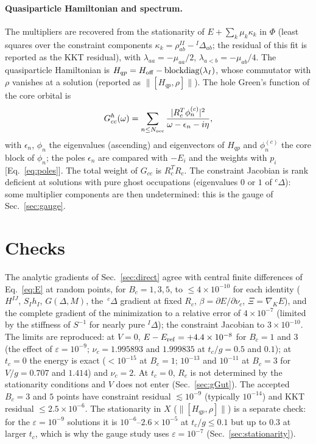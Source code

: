 \documentclass[11pt]{article}
\begin{document}
\paragraph{Quasiparticle Hamiltonian and spectrum.}\label{sec:spectrum}
The multipliers are recovered from the stationarity of $E+\sum_k\mu_k\kappa_k$ in $\Phi$ (least squares over the constraint
components $\kappa_k=\rho^{II}_{ab}-{}^I\Delta_{ab}$; the residual of this fit is reported as the KKT residual), with
$\lambda_{aa}=-\mu_{aa}/2$, $\lambda_{a<b}=-\mu_{ab}/4$. The quasiparticle Hamiltonian is
$H_{qp}=H_{\rm off}-\mathrm{blockdiag}(\lambda_I)$, whose commutator with $\rho$ vanishes at a solution (reported as
$\|[H_{qp},\rho]\|$). The hole Green's function of the core orbital is
\begin{equation}
G^h_{cc}(\omega)=\sum_{n\le N_{\rm occ}}\frac{|R_c^T\phi^{(c)}_n|^2}{\omega-\epsilon_n-i\eta},
\label{eq:Ghgg}
\end{equation}
with $\epsilon_n$, $\phi_n$ the eigenvalues (ascending) and eigenvectors of $H_{qp}$ and $\phi^{(c)}_n$ the core block of $\phi_n$;
the poles $\epsilon_n$ are compared with $-E_i$ and the weights with $p_i$ [Eq.~\eqref{eq:poles}]. The total weight of $G_{cc}$ is
$R_c^TR_c$. The constraint Jacobian is rank deficient at solutions with pure ghost occupations (eigenvalues $0$ or $1$ of
${}^c\Delta$): some multiplier components are then undetermined: this is the gauge of Sec.~\ref{sec:gauge}.

\section{Checks}
\label{sec:checks}

The analytic gradients of Sec.~\ref{sec:direct} agree with central finite differences of Eq.~\eqref{eq:E} at random points, for $B_c=1,3,5$, to $\le4\times10^{-10}$ for each identity
($H^{IJ}$, $S_Ih_I$, $G(\Delta,M)$, the $\,{}^c\Delta$ gradient at fixed $R_c$, $\beta=\partial E/\partial\nu_c$, $\Xi=\nabla_KE$), and the complete gradient of the minimization to a relative error of $4\times10^{-7}$ (limited by the stiffness of $S^{-1}$ for nearly pure ${}^I\Delta$); the constraint Jacobian to $3\times10^{-10}$.
The limits are reproduced: at $V=0$, $E-E_{\rm ref}=+4.4\times10^{-8}$ for $B_c=1$ and $3$ (the effect of $\varepsilon=10^{-9}$; $\nu_c=1.995893$ and $1.999835$ at $t_c/g=0.5$ and $0.1$); at $t_c=0$ the energy is exact ($<10^{-15}$ at $B_c=1$; $10^{-13}$ and $10^{-11}$ at $B_c=3$ for $V/g=0.707$ and $1.414$) and $\nu_c=2$. At $t_c=0$, $R_c$ is not determined by the stationarity conditions and $V$ does not enter (Sec.~\ref{sec:gGut}).
The accepted $B_c=3$ and $5$ points have constraint residual $\lesssim10^{-9}$ (typically $10^{-14}$) and KKT residual $\le2.5\times10^{-6}$.
The stationarity in $X$ ($\|[H_{qp},\rho]\|$) is a separate check: for the $\varepsilon=10^{-9}$ solutions it is $10^{-6}$--$2.6\times10^{-5}$ at $t_c/g\le0.1$ but up to $0.3$ at larger $t_c$, which is why the gauge study uses $\varepsilon=10^{-7}$ (Sec.~\ref{sec:stationarity}).
\end{document}
